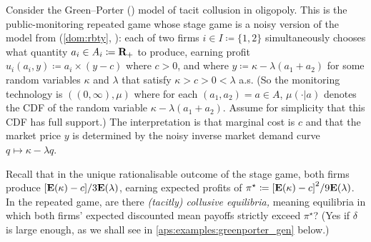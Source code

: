 \begin{example}
	\label{example:greenporter}
	Consider the Green--Porter (\citeyear{GreenPorter1984}) model of tacit collusion in oligopoly. This is the public-monitoring repeated game whose stage game is a noisy version of the \textcite{Cournot1838} model from  (\cref{dom:rbty}, ): each of two firms $i \in I \coloneqq \{1,2\}$ simultaneously chooses what quantity $a_i \in A_i \coloneqq \mathbf{R}_+$ to produce, earning profit $u_i\left(a_i,y\right) \coloneqq a_i \times (y - c)$ where $c>0$, and where $y \coloneqq \kappa - \lambda(a_1+a_2)$ for some random variables $\kappa$ and $\lambda$ that satisfy $\kappa > c > 0 < \lambda$ a.s.
	(So the monitoring technology is $((0,\infty),\mu)$ where for each $(a_1,a_2) = a \in A$, $\mu(\cdot|a)$ denotes the CDF of the random variable $\kappa - \lambda(a_1+a_2)$. Assume for simplicity that this CDF has full support.) The interpretation is that marginal cost is $c$ and that the market price $y$ is determined by the noisy inverse market demand curve $q \mapsto \kappa - \lambda q$.

	Recall that in the unique rationalisable outcome of the stage game, both firms produce $\left[\E(\kappa)-c\right]/3\E(\lambda)$, earning expected profits of $\pi^\star \coloneqq \left[\E(\kappa)-c\right]^2 / 9 \E(\lambda)$. In the repeated game, are there \emph{(tacitly) collusive equilibria,} meaning equilibria in which both firms' expected discounted mean payoffs strictly exceed $\pi^\star$? (Yes if $\delta$ is large enough, as we shall see in \cref{aps:examples:greenporter_gen} below.)
\end{example}

